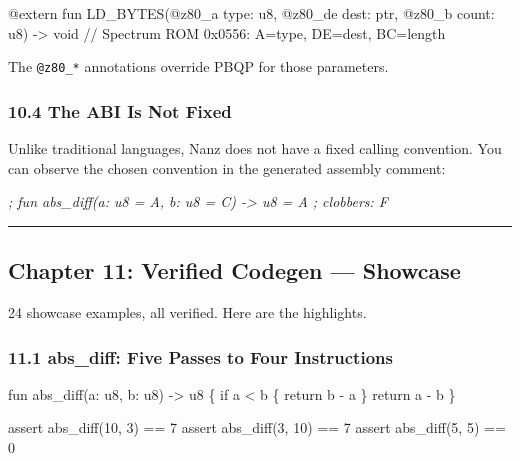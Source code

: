 \documentclass[
  11pt,
]{article}
\newenvironment{Shaded}{\begin{snugshade}}{\end{snugshade}}
\newcommand{\CommentTok}[1]{\textcolor[rgb]{0.56,0.35,0.01}{\textit{#1}}}
\newcommand{\NormalTok}[1]{#1}
\begin{document}
\begin{Shaded}
\begin{Highlighting}[]
\NormalTok{@extern fun LD\_BYTES(@z80\_a type: u8, @z80\_de dest: ptr, @z80\_b count: u8) {-}\textgreater{} void}
\NormalTok{// Spectrum ROM 0x0556: A=type, DE=dest, BC=length}
\end{Highlighting}
\end{Shaded}

The \texttt{@z80\_*} annotations override PBQP for those parameters.

\hypertarget{the-abi-is-not-fixed}{%
\subsubsection{10.4 The ABI Is Not Fixed}\label{the-abi-is-not-fixed}}

Unlike traditional languages, Nanz does not have a fixed calling
convention. You can observe the chosen convention in the generated
assembly comment:

\begin{Shaded}
\begin{Highlighting}[]
\CommentTok{; fun abs\_diff(a: u8 = A, b: u8 = C) {-}\textgreater{} u8 = A ; clobbers: F}
\end{Highlighting}
\end{Shaded}

\begin{center}\rule{0.5\linewidth}{0.5pt}\end{center}

\hypertarget{chapter-11-verified-codegen-showcase}{%
\subsection{Chapter 11: Verified Codegen ---
Showcase}\label{chapter-11-verified-codegen-showcase}}

24 showcase examples, all verified. Here are the highlights.

\hypertarget{abs_diff-five-passes-to-four-instructions}{%
\subsubsection{11.1 abs\_diff: Five Passes to Four
Instructions}\label{abs_diff-five-passes-to-four-instructions}}

\begin{Shaded}
\begin{Highlighting}[]
\NormalTok{fun abs\_diff(a: u8, b: u8) {-}\textgreater{} u8 \{}
\NormalTok{    if a \textless{} b \{ return b {-} a \}}
\NormalTok{    return a {-} b}
\NormalTok{\}}

\NormalTok{assert abs\_diff(10, 3) == 7}
\NormalTok{assert abs\_diff(3, 10) == 7}
\NormalTok{assert abs\_diff(5, 5)  == 0}
\end{Highlighting}
\end{Shaded}
\end{document}
